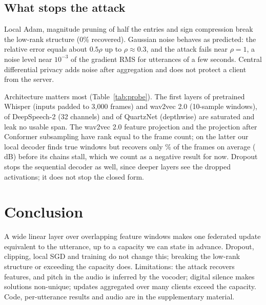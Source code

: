 \documentclass{Interspeech}
\begin{document}
\subsection{What stops the attack}
Local Adam, magnitude pruning of half the entries and sign compression break the low-rank structure
(0\% recovered). Gaussian noise behaves as predicted: the relative error equals about $0.5\rho$ up to
$\rho\approx0.3$, and the attack fails near $\rho=1$, a noise level near $10^{-3}$ of the gradient RMS
for utterances of a few seconds. Central differential privacy adds noise after aggregation and does not
protect a client from the server.

\begin{table}[t]
\caption{Gradient rank of early layers on one 5\,s utterance (Whisper and wav2vec 2.0 with released
weights). A layer leaks a usable span when the rank equals the number of windows and is below both of its
dimensions.}
\label{tab:probe}
\centering\footnotesize
\setlength{\tabcolsep}{3pt}

\end{table}

Architecture matters most (Table~\ref{tab:probe}). The first layers of pretrained Whisper (inputs padded to 3{,}000 frames) and wav2vec
2.0 \cite{baevski2020wav2vec} (10-sample windows), of DeepSpeech-2 \cite{amodei2015deep} (32 channels)
and of QuartzNet \cite{kriman2020quartznet} (depthwise) are saturated and leak no usable span. The
wav2vec 2.0 feature projection and the projection after Conformer subsampling have rank equal to the
frame count; on the latter our local decoder finds true windows but recovers only \ConfCov\% of the frames on average
(\ConfSNR\,dB) before its chains stall, which we count as a negative result for now. Dropout stops the
sequential decoder as well, since deeper layers see the dropped activations; it does not stop the closed form.

\section{Conclusion}

A wide linear layer over overlapping feature windows makes one federated update equivalent to the
utterance, up to a capacity we can state in advance. Dropout, clipping, local SGD and training do not
change this; breaking the low-rank structure or exceeding the capacity does. Limitations: the attack
recovers features, and pitch in the audio is inferred by the vocoder; digital silence makes solutions
non-unique; updates aggregated over many clients exceed the capacity. Code, per-utterance results and
audio are in the supplementary material.
\end{document}
